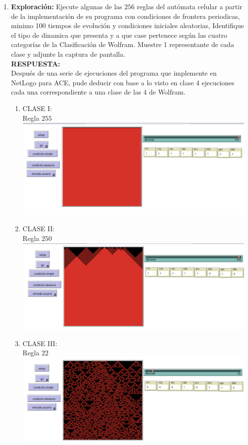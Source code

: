 \documentclass[12pt]{article}
\begin{document}
\begin{enumerate}
    \item \textbf{Exploración:} Ejecute algunas de las $256$ reglas del autómata celular a partir de la implementación de su programa con condiciones de frontera periodicas, minimo 100 tiempos de
    evolución y condiciones iniciales aleatorias, Identifique el tipo de dinamica que presenta y a que case pertenece según las cuatro categorías de la Clasificación de Wolfram. Muestre 1 representante de cada clase y adjunte la 
    captura de pantalla.\\
    \textbf{\color{red} RESPUESTA:}\\
    Después de una serie de ejecuciones del programa que implemente en NetLogo para ACE, pude deducir con base a lo visto en clase 4 ejecuciones cada una correspondiente a una clase de las 4 de Wolfram.
    \begin{enumerate}
        \item CLASE I:\\ Regla $255$
        \includegraphics[scale = 0.40]{images/clase1_255.png}
        \item CLASE II:\\ Regla $250$
        \includegraphics[scale = 0.40]{images/clase2_250.png}
        \item CLASE III:\\ Regla $22$
        \includegraphics[scale = 0.40]{images/clase3_22.png}

\end{enumerate}
\end{enumerate}
\end{document}
